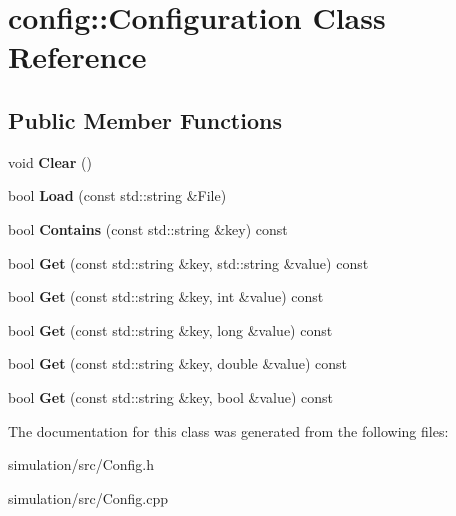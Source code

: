 \hypertarget{classconfig_1_1_configuration}{}\section{config\+:\+:Configuration Class Reference}
\label{classconfig_1_1_configuration}
\subsection*{Public Member Functions}
\begin{DoxyCompactItemize}
\item 
\mbox{\label{classconfig_1_1_configuration_a793f44d0706db6e3ce92bc024f772869}} 
void {\bfseries Clear} ()
\item 
\mbox{\label{classconfig_1_1_configuration_ac259be785f0656ead250ae257e95b0e3}} 
bool {\bfseries Load} (const std\+::string \&File)
\item 
\mbox{\label{classconfig_1_1_configuration_a51219b5a99dba44cc476d2910a2eec35}} 
bool {\bfseries Contains} (const std\+::string \&key) const
\item 
\mbox{\label{classconfig_1_1_configuration_a736adaece5e94d67416a752607c59698}} 
bool {\bfseries Get} (const std\+::string \&key, std\+::string \&value) const
\item 
\mbox{\label{classconfig_1_1_configuration_a34d6fdbec3fd5303aa27583c9c0deaba}} 
bool {\bfseries Get} (const std\+::string \&key, int \&value) const
\item 
\mbox{\label{classconfig_1_1_configuration_a0489785801f516f664f7a2609e1e69a1}} 
bool {\bfseries Get} (const std\+::string \&key, long \&value) const
\item 
\mbox{\label{classconfig_1_1_configuration_a7e1227efb413e823ab80384987076ffb}} 
bool {\bfseries Get} (const std\+::string \&key, double \&value) const
\item 
\mbox{\label{classconfig_1_1_configuration_addb88e4bc970862d58700bb16264662d}} 
bool {\bfseries Get} (const std\+::string \&key, bool \&value) const
\end{DoxyCompactItemize}


The documentation for this class was generated from the following files\+:\begin{DoxyCompactItemize}
\item 
simulation/src/Config.\+h\item 
simulation/src/Config.\+cpp\end{DoxyCompactItemize}
